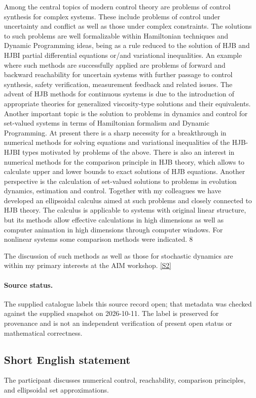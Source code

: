 \documentclass[11pt]{article}
\newcommand{\sref}[2]{\hyperlink{source:#1:#2}{[S#2]}}
\begin{document}
Among the central topics of modern control theory are problems of control synthesis for complex systems. These include problems of control under uncertainty and conflict as well as those under complex constraints. The solutions to such problems are well formalizable within Hamiltonian techniques and Dynamic Programming ideas, being as a rule reduced to the solution of HJB and HJBI partial differential equations or/and variational inequalities. An example where such methods are successfully applied are problems of forward and backward reachability for uncertain systems with further passage to control synthesis, safety verification, measurement feedback and related issues. The advent of HJB methods for continuous systems is due to the introduction of appropriate theories for generalized viscosity-type solutions and their equivalents. Another important topic is the solution to problems in dynamics and control for set-valued systems in terms of Hamiltonian formalism and Dynamic Programming. At present there is a sharp necessity for a breakthrough in numerical methods for solving equations and variational inequalities of the HJB-HJBI types motivated by problems of the above. There is also an interest in numerical methods for the comparison principle in HJB theory, which allows to calculate upper and lower bounds to exact solutions of HJB equations. Another perspective is the calculation of set-valued solutions to problems in evolution dynamics, estimation and control. Together with my colleagues we have developed an ellipsoidal calculus aimed at such problems and closely connected to HJB theory. The calculus is applicable to systems with original linear structure, but its methods allow effective calculations in high dimensions as well as computer animation in high dimensions through computer windows. For nonlinear systems some comparison methods were indicated. 8

The discussion of such methods as well as those for stochastic dynamics are within my primary interests at the AIM workshop. \sref{statement}{2}
\paragraph{Source status.}
The supplied catalogue labels this source record open; that metadata was checked against the supplied snapshot on 2026-10-11. The label is preserved for provenance and is not an independent verification of present open status or mathematical correctness.
\subsection{Short English statement}
The participant discusses numerical control, reachability, comparison principles, and ellipsoidal set approximations.
\end{document}
